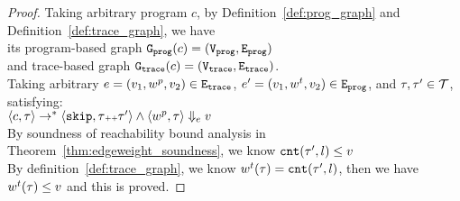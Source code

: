 \begin{proof}
Taking arbitrary program $c$,
by Definition~\ref{def:prog_graph} and Definition~\ref{def:trace_graph}, 
we have   
\\
its program-based graph $\mathtt{{G_{prog}}}({c}) = (\mathtt{{V_{prog}}}, \mathtt{{E_{prog}}})$ 
\\
and 
trace-based graph $\mathtt{{G_{trace}}}({c}) = (\mathtt{{V_{trace}}}, \mathtt{{E_{trace}}})$.
\\
Taking arbitrary 
$e = (v_1, w^p, v_2) \in \mathtt{{E_{trace}}}$,
$e' = (v_1, w^t, v_2) \in \mathtt{{E_{prog}}}$, and $\mathtt{\tau}, \mathtt{\tau}' \in \mathcal{T}$, satisfying:
\\
$\langle {c}, \mathtt{\tau} \rangle \to^{*} \langle \mathtt{skip}, \mathtt{\tau}{\scriptscriptstyle ++}\mathtt{\tau}' \rangle 
\land 
\langle w^{p}, \mathtt{\tau} \rangle \Downarrow_e v$
\\
By soundness of reachability bound analysis in Theorem~\ref{thm:edgeweight_soundness}, we know 
$\mathtt{cnt}(\mathtt{\tau}', l) \leq v$
\\
By definition~\ref{def:trace_graph}, we know $w^t(\mathtt{\tau}) = \mathtt{cnt}(\mathtt{\tau}', l)$,
then we have $w^t(\mathtt{\tau}) \leq v$ and this is proved.
\end{proof}
